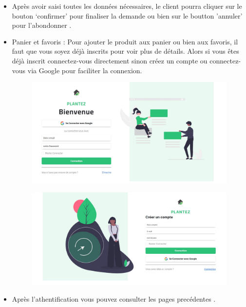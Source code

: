 \documentclass[a4paper,12pt,oneside]{article}
\begin{document}
{\begin{enumerate}
\begin{itemize}
		\item Après avoir saisi toutes les données nécessaires, le client pourra cliquer sur le bouton ‘confirmer’
pour finaliser la demande ou bien sur le boutton 'annuler' pour l’abondonner .
\newpage
		
		\item Panier et favoris :
		Pour ajouter le produit aux panier ou bien aux favoris, il faut que vous soyez déjà inscrits pour voir
plus de détails.
Alors si vous êtes déjà inscrit connectez-vous directement sinon créez un compte ou connectez-vous
via Google pour faciliter la connexion.		
		
		\begin{figure}[h]
		\centering
  		\includegraphics[width=1\textwidth]{login}
		\end{figure}
		
		\begin{figure}[h]
		\centering
  		\includegraphics[width=1\textwidth]{signup}
		\end{figure}
	\newpage
		\item Après l’athentification vous pouvez consulter les pages precédentes .
		

\end{itemize}
\end{enumerate}}
\end{document}
